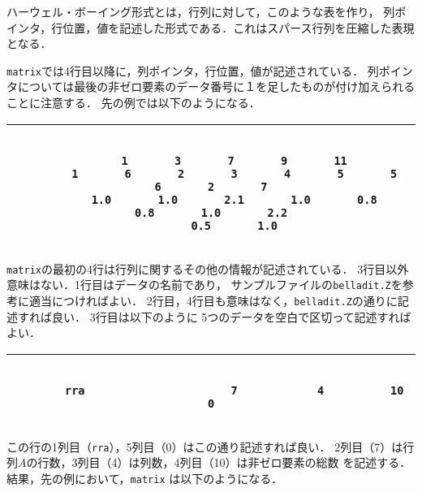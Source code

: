 ハーウェル・ボーイング形式とは，行列に対して，このような表を作り，
列ポインタ，行位置，値を記述した形式である．これはスパース行列を圧縮した表現となる．

{\tt matrix}では4行目以降に，列ポインタ，行位置，値が記述されている．
列ポインタについては最後の非ゼロ要素のデータ番号に１を足したものが付け加えられることに注意する．
先の例では以下のようになる．

\bigskip

\small
\begin{tabular}{|c|} \hline
\begin{minipage}{134mm}
\begin{verbatim}

       1       3       7       9       11
       1       6       2       3       4       5       5       6       2       7
       1.0       1.0       2.1       1.0       0.8       0.8       1.0       2.2
       0.5       1.0

\end{verbatim}
\end{minipage}
\\
\hline
\end{tabular}
\normalsize

\bigskip

{\tt matrix}の最初の4行は行列に関するその他の情報が記述されている．
3行目以外意味はない．1行目はデータの名前であり，
サンプルファイルの{\tt belladit.Z}を参考に適当につければよい．
2行目，4行目も意味はなく，{\tt belladit.Z}の通りに記述すれば良い．
3行目は以下のように 5つのデータを空白で区切って記述すればよい．

\bigskip

\small
\begin{tabular}{|c|} \hline
\begin{minipage}{134mm}
\begin{verbatim}

       rra                      7            4          10             0

\end{verbatim}
\end{minipage}
\\
\hline
\end{tabular}
\normalsize

\bigskip

この行の1列目（\verb|rra|），5列目（0）はこの通り記述すれば良い．
2列目（7）は行列\( A \)の行数，3列目（4）は列数，4列目（10）は非ゼロ要素の総数
を記述する．結果，先の例において，{\tt matrix} は以下のようになる．

